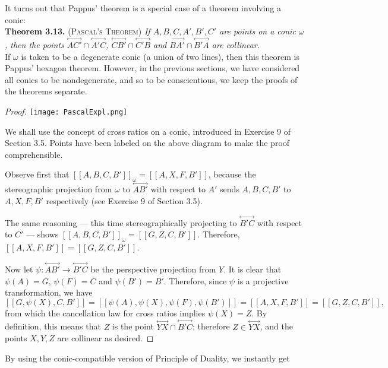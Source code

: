 \documentclass[leqno]{book}
\begin{document}
\noindent It turns out that Pappus' theorem is a special case of a theorem involving a conic:\\

\noindent\textbf{Theorem 3.13.} \textsc{(Pascal's Theorem)} \emph{If $A,B,C,A',B',C'$ are points on a conic $\omega$, then the points $\overset{\longleftrightarrow}{AC'}\cap\overset{\longleftrightarrow}{A'C}$, $\overset{\longleftrightarrow}{CB'}\cap\overset{\longleftrightarrow}{C'B}$ and $\overset{\longleftrightarrow}{BA'}\cap\overset{\longleftrightarrow}{B'A}$ are collinear.}\\

\noindent If $\omega$ is taken to be a degenerate conic (a union of two lines), then this theorem is Pappus' hexagon theorem.  However, in the previous sections, we have considered all conics to be nondegenerate, and so to be conscientious, we keep the proofs of the theorems separate.
\begin{proof}
\texttt{[image: PascalExpl.png]}

We shall use the concept of cross ratios on a conic, introduced in Exercise 9 of Section 3.5.  Points have been labeled on the above diagram to make the proof comprehensible.

Observe first that $[\![A,B,C,B']\!]_\omega=[\![A,X,F,B']\!]$, because the stereographic projection from $\omega$ to $\overset{\longleftrightarrow}{AB'}$ with respect to $A'$ sends $A,B,C,B'$ to $A,X,F,B'$ respectively (see Exercise 9 of Section 3.5).

The same reasoning \---- this time stereographically projecting to $\overset{\longleftrightarrow}{B'C}$ with respect to $C'$ \---- shows $[\![A,B,C,B']\!]_\omega=[\![G,Z,C,B']\!]$.  Therefore, $[\![A,X,F,B']\!]=[\![G,Z,C,B']\!]$.

Now let $\psi:\overset{\longleftrightarrow}{AB'}\to\overset{\longleftrightarrow}{B'C}$ be the perspective projection from $Y$.  It is clear that $\psi(A)=G$, $\psi(F)=C$ and $\psi(B')=B'$.  Therefore, since $\psi$ is a projective transformation, we have
$$[\![G,\psi(X),C,B']\!]=[\![\psi(A),\psi(X),\psi(F),\psi(B')]\!]=[\![A,X,F,B']\!]=[\![G,Z,C,B']\!],$$
from which the cancellation law for cross ratios implies $\psi(X)=Z$.  By definition, this means that $Z$ is the point $\overset{\longleftrightarrow}{YX}\cap\overset{\longleftrightarrow}{B'C}$; therefore $Z\in\overset{\longleftrightarrow}{YX}$, and the points $X,Y,Z$ are collinear as desired.
\end{proof}

\noindent By using the conic-compatible version of Principle of Duality, we instantly get\\
\end{document}
